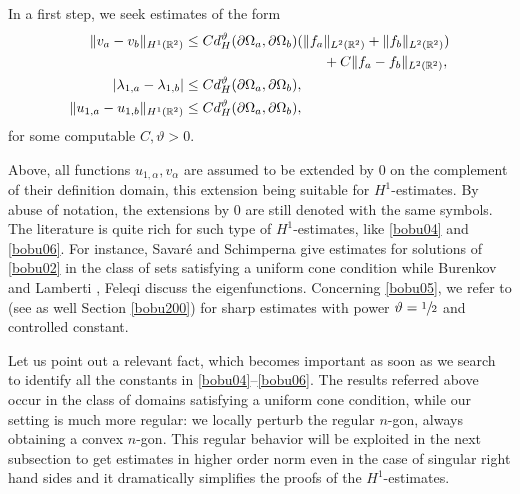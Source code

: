\documentclass[JEP,XML,SOM,Unicode,ThmDefs,NoFloatCountersInSection,published]{cedram}
\theoremstyle{plain}
\theoremstyle{definition}
\newcommand{\thetathree}{\vartheta}
\def\R{\mathbb{R}}
\newcommand{\Om}{\Omega}
\newcommand{\lb}{\lambda}
\begin{document}
In a first step, we seek estimates of the form
\begin{align}\label{bobu04}
\|v_a-v_b\|_{H^1(\R^2)}&\le Cd_H^{\thetathree}(\partial \Om_a, \partial \Om_b)(\|f_a\|_{L^2(\R^2)}+\|f_b\|_{L^2(\R^2)})\\
&\hspace*{3.5cm} + C\|f_a-f_b\|_{L^2(\R^2)},\notag
\\
\label{bobu05}
|\lb_{1,a}-\lb_{1,b}| &\le Cd_H^{\thetathree}(\partial \Om_a, \partial \Om_b),
\\
\label{bobu06}
\|u_{1,a}-u_{1,b}\|_{H^1(\R^2)}&\le Cd_H^{\thetathree}(\partial \Om_a, \partial \Om_b),
\end{align}
for some computable $C, \thetathree>0$.

Above, all functions $u_{1,\alpha}, v_\alpha$ are assumed to be extended by $0$ on the complement of their definition domain, this extension being suitable for $H^1$-estimates. By abuse of notation, the extensions by $0$ are still denoted with the same symbols.
The literature is quite rich for such type of $H^1$-estimates, like \eqref{bobu04} and \eqref{bobu06}. For instance, Savaré and Schimperna \cite{SaSc02} give estimates for
solutions of \eqref{bobu02} in the class of sets satisfying a uniform cone condition while Burenkov and Lamberti \cite{BBL10}, Feleqi \cite{FE16} discuss the eigenfunctions. Concerning \eqref{bobu05}, we refer to \cite{Pa97} (see as well Section \ref{bobu200}) for sharp estimates with power $\vartheta =\sfrac 12$ and controlled constant.

Let us point out a relevant fact, which becomes important as soon as we search to identify all the constants in \eqref{bobu04}--\eqref{bobu06}. The results referred above occur in the class of domains satisfying a uniform cone condition, while our setting is much more regular: we locally perturb the regular $n$-gon, always obtaining a convex $n$-gon. This regular behavior will be exploited in the next subsection to get estimates in higher order norm even in the case of singular right hand sides and it dramatically simplifies the proofs of the $H^1$-estimates.
\end{document}
